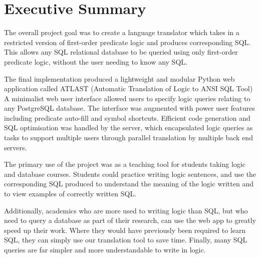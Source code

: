 \documentclass[a4paper, 11pt]{article}
\begin{document}
\renewcommand{\contentsname}{\huge Contents \vspace{1cm}}
\tableofcontents
\clearpage

\setlength{\parskip}{0.3cm} \setlength{\parindent}{0cm}

\section{Executive Summary}

  The overall project goal was to create a language translator which
  takes in a restricted version of first-order predicate logic and
  produces corresponding SQL. This allows any SQL relational
  database to be queried using only first-order predicate logic, without the
  user needing to know any SQL.

  The final implementation produced a lightweight and modular Python web
  application called ATLAST (Automatic Translation of Logic to ANSI SQL Tool)
  A minimalist web user interface allowed users to specify logic queries
  relating to any PostgreSQL database. The interface was augmented
  with power user features including predicate auto-fill and symbol shortcuts.
  Efficient code generation and SQL optimisation was handled by the server,
  which encapsulated logic queries as tasks to support multiple users through
  parallel translation by multiple back end servers.

  The primary use of the project was as a teaching tool for students taking
  logic and database courses. Students could practice writing logic sentences,
  and use the corresponding SQL produced to understand the meaning of the logic
  written and to view examples of correctly written SQL.

  Additionally, academics who are more used to writing logic than SQL, but who
  need to query a database as part of their research, can use the web app to
  greatly speed up their work. Where they would have previously been required to
  learn SQL, they can simply use our translation tool to save time. Finally,
  many SQL queries are far simpler and more understandable to write in logic.
\end{document}
